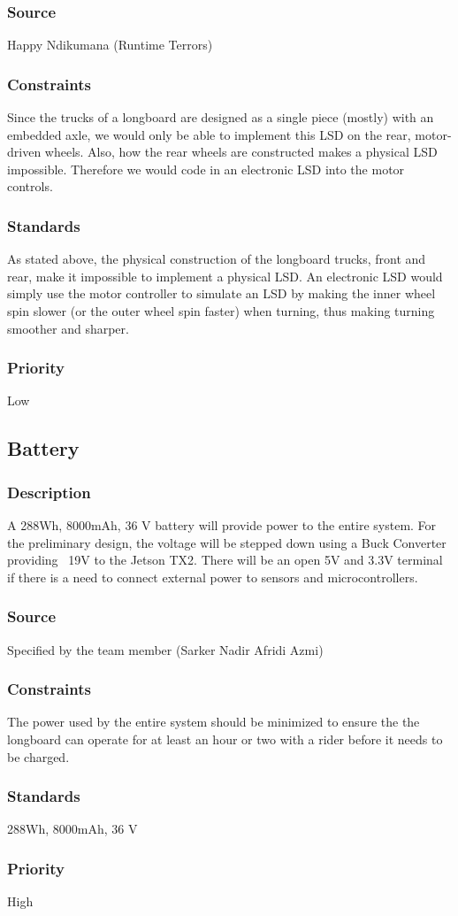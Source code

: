 \subsubsection{Source}
Happy Ndikumana (Runtime Terrors)
\subsubsection{Constraints}
Since the trucks of a longboard are designed as a single piece (mostly) with an embedded axle, we would only be able to implement this LSD on the rear, motor-driven wheels. Also, how the rear wheels are constructed makes a physical LSD impossible. Therefore we would code in an electronic LSD into the motor controls.
\subsubsection{Standards}
As stated above, the physical construction of the longboard trucks, front and rear, make it impossible to implement a physical LSD. An electronic LSD would simply use the motor controller to simulate an LSD by making the inner wheel spin slower (or the outer wheel spin faster) when turning, thus making turning smoother and sharper.
\subsubsection{Priority}
Low

\subsection{Battery}
\subsubsection{Description}
A 288Wh, 8000mAh, 36 V battery will provide power to the entire system. For the preliminary design, the voltage will be stepped down using a Buck Converter providing ~19V to the Jetson TX2. There will be an open 5V and 3.3V terminal if there is a need to connect external power to sensors and microcontrollers.
\subsubsection{Source}
Specified by the team member (Sarker Nadir Afridi Azmi)
\subsubsection{Constraints}
The power used by the entire system should be minimized to ensure the the longboard can operate for at least an hour or two with a rider before it needs to be charged.
\subsubsection{Standards}
288Wh, 8000mAh, 36 V
\subsubsection{Priority}
High